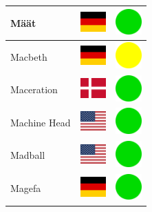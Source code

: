 \documentclass[12pt, a4paper, twoside]{report}
\begin{document}
\begin{center}
\begin{longtable}{|p{5cm}|p{2cm}|p{2cm}|}
 Määt                                                       & \includegraphics[width=1cm]{4x3/de} &   \includegraphics[width=1cm]{likes/y} \\ \hline
 Macbeth                                                    & \includegraphics[width=1cm]{4x3/de} &   \includegraphics[width=1cm]{likes/m} \\ \hline
 Maceration                                                 & \includegraphics[width=1cm]{4x3/dk} &   \includegraphics[width=1cm]{likes/y} \\ \hline
 Machine Head                                               & \includegraphics[width=1cm]{4x3/us} &   \includegraphics[width=1cm]{likes/y} \\ \hline
 Madball                                                    & \includegraphics[width=1cm]{4x3/us} &   \includegraphics[width=1cm]{likes/y} \\ \hline
 Magefa                                                     & \includegraphics[width=1cm]{4x3/de} &   \includegraphics[width=1cm]{likes/y} \\ \hline

\end{longtable}
\end{center}
\end{document}
